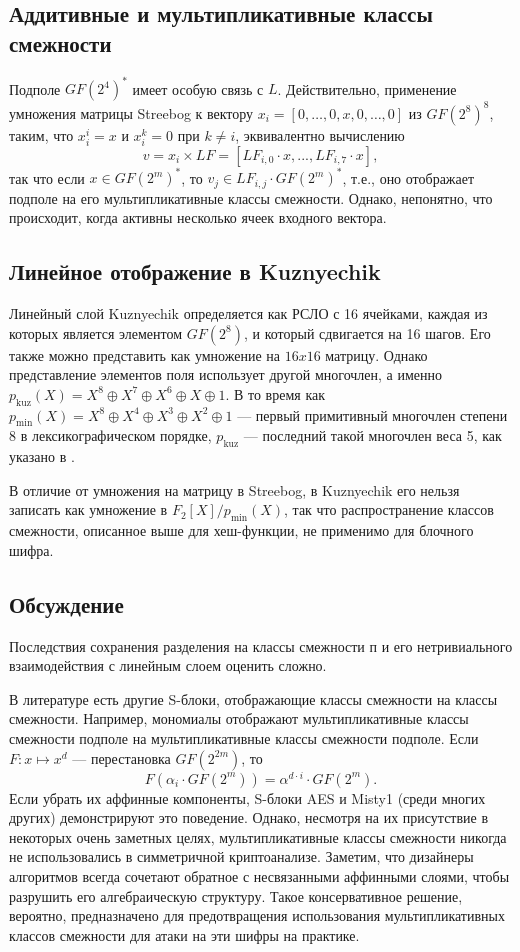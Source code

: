 \subsection{Аддитивные и мультипликативные классы смежности}

Подполе $GF(2^4)^*$ имеет особую связь с $L$. Действительно, применение умножения матрицы Streebog к вектору \(x_i = [0, \ldots, 0, x, 0, \ldots, 0]\) из $GF(2^8)^8$, таким, что \(x_i^i = x\) и \(x_i^k = 0\) при \(k \neq i\), эквивалентно вычислению
\[
v = x_i \times LF = [LF_{i,0} \cdot x, ..., LF_{i,7} \cdot x],
\]
так что если \(x \in GF(2^m)^*\), то \(v_j \in LF_{i,j} \cdot GF(2^m)^*\), т.е., оно отображает подполе на его мультипликативные классы смежности. Однако, непонятно, что происходит, когда активны несколько ячеек входного вектора.

\subsection{Линейное отображение в Kuznyechik}
Линейный слой Kuznyechik определяется как РСЛО с 16 ячейками, каждая из которых является элементом $GF(2^8)$, и который сдвигается на 16 шагов. Его также можно представить как умножение на $16 x 16$ матрицу. Однако представление элементов поля использует другой многочлен, а именно \(p_{\text{kuz}}(X) = X^8 \oplus X^7 \oplus X^6 \oplus X \oplus 1\). В то время как \(p_{\text{min}}(X) = X^8 \oplus X^4 \oplus X^3 \oplus X^2 \oplus 1\) — первый примитивный многочлен степени 8 в лексикографическом порядке, \(p_{\text{kuz}}\) — последний такой многочлен веса 5, как указано в \cite{LN97}.

В отличие от умножения на матрицу в Streebog, в Kuznyechik его нельзя записать как умножение в $F_2[X]/p_{\text{min}}(X)$, так что распространение классов смежности, описанное выше для хеш-функции, не применимо для блочного шифра.

\subsection{Обсуждение}

Последствия сохранения разделения на классы смежности п и его нетривиального взаимодействия с линейным слоем оценить сложно.

В литературе есть другие S-блоки, отображающие классы смежности на классы смежности. Например, мономиалы отображают мультипликативные классы смежности подполе на мультипликативные классы смежности подполе. Если \(F: x \mapsto x^d\) — перестановка $GF(2^{2m})$, то
\[
F(\alpha_i \cdot GF(2^m)) = \alpha^{d \cdot i} \cdot GF(2^m).
\]
Если убрать их аффинные компоненты, S-блоки AES \cite{AES01} и Misty1 \cite{Mat97} (среди многих других) демонстрируют это поведение. Однако, несмотря на их присутствие в некоторых очень заметных целях, мультипликативные классы смежности никогда не использовались в симметричной криптоанализе. Заметим, что дизайнеры алгоритмов всегда сочетают обратное с несвязанными аффинными слоями, чтобы разрушить его алгебраическую структуру. Такое консервативное решение, вероятно, предназначено для предотвращения использования мультипликативных классов смежности для атаки на эти шифры на практике.

